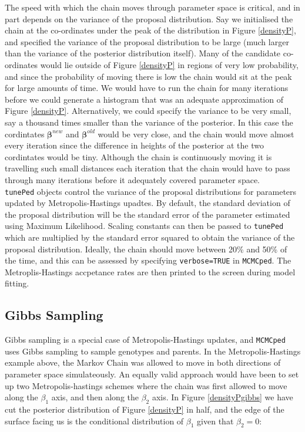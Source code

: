 \documentclass{article}
\begin{document}
The speed with which the chain moves through parameter space is critical, and in part depends on the variance of the proposal distribution.  Say we initialised the chain at the co-ordinates under the peak of the distribution in Figure \ref{densityP}, and specified the variance of the proposal distribution to be large (much larger than the variance of the posterior distribution itself). Many of the candidate co-ordinates would lie outside of Figure \ref{densityP} in regions of very low probability, and since the probability of moving there is low the chain would sit at the peak for large amounts of time.  We would have to run the chain for many iterations before we could generate a histogram that was an adequate approximation of Figure \ref{densityP}.  Alternatively, we could specify the variance to be very small, say a thousand times smaller than the variance of the posterior.  In this case the cordintates $\bm{\beta}^{new}$ and $\bm{\beta}^{old}$ would be very close, and the chain would move almost every iteration since the difference in heights of the posterior at the two cordintates would be tiny.  Although the chain is continuously moving it is travelling such small distances each iteration that the chain would have to pass through many iterations before it adequately covered parameter space.\\  

\texttt{tunePed} objects control the variance of the proposal distributions for parameters updated by Metropolis-Hastings upadtes.  By default, the standard deviation of the proposal distribution will be the standard error of the parameter estimated using Maximum Likelihood.  Scaling constants can then be passed to \texttt{tunePed} which are multiplied by the standard error squared to obtain the variance of the proposal distribution.  Ideally, the chain should move between 20\% and 50\% of the time, and this can be assessed by specifying \texttt{verbose=TRUE} in \texttt{MCMCped}.  The Metroplis-Hastings accpetance rates are then printed to the screen during model fitting.
 
\subsection{Gibbs Sampling}

Gibbs sampling is a special case of Metropolis-Hastings updates, and \texttt{MCMCped} uses Gibbs sampling to sample genotypes and parents.  In the Metropolis-Hastings example above, the Markov Chain was allowed to move in both directions of parameter space simulateously.  An equally valid approach would have been to set up two Metropolis-hastings schemes where the chain was first allowed to move along the $\beta_{1}$ axis, and then along the $\beta_{2}$ axis. In Figure \ref{densityPgibbs} we have cut the posterior distribution of Figure \ref{densityP} in half, and the edge of the surface facing us is the conditional distribution of $\beta_{1}$ given that $\beta_{2}=0$: 
\end{document}
